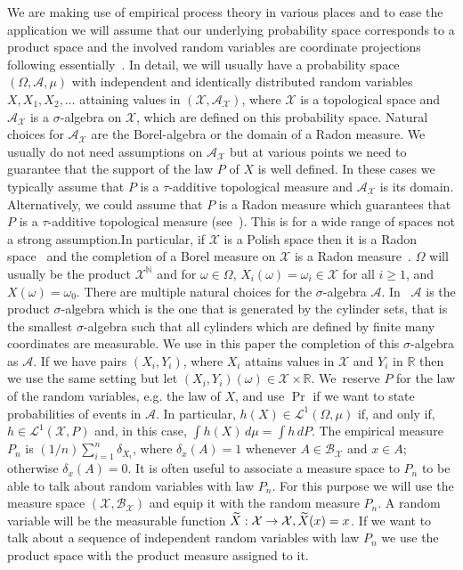 \documentclass[10pt]{amsart}
\theoremstyle{definition}\newtheorem{defi}[theo]{Definition}\newtheorem{rema}[theo]{Remark}\newtheorem{exam}[theo]{Example}\newtheorem{exem}[theo]{Example}\newtheorem{nota}[theo]{Notation}
\theoremstyle{remark}
\newcommand{\R}{\mathbb{R}}
\newcommand{\bbN}{\mathbb{N}}
\newcommand{\X}{\mathcal{X}}
\newcommand{\clB}{\mathcal{B}}
\newcommand{\clA}{\mathcal{A}}
\newcommand{\clL}{\mathcal{L}}
\newcommand*{\MK}{\mkern 2mu}
\let\oldtilde\tilde
\renewcommand*{\tilde}[1]{\mathchoice{\widetilde{#1}}{\widetilde{#1}}{\oldtilde{#1}}{\oldtilde{#1}}}
\renewcommand*{\to}{\mathchoice{\longrightarrow}{\rightarrow}{\rightarrow}{\rightarrow}}
\begin{document}
We are making use of empirical process theory in various places and to ease the application we will assume that our underlying probability space corresponds to a product space and the involved random variables are coordinate projections following essentially~\cite[Section~3.1]{DUDLEY14}. In detail, we will usually have a probability space $(\Omega,\clA,\mu)$ with independent and identically distributed random variables $X,X_1,X_2,\dots $ attaining values in $(\X,\clA_\X)$, where $\X$ is a topological space and $\clA_\X$ is a $\sigma$-algebra on $\X$, which are defined on this probability space. Natural choices for $\clA_\X$ are the Borel-algebra or the domain of a Radon measure. We usually do not need assumptions on $\clA_\X$ but at various points we need to guarantee that the support of the law $P$ of $X$ is well defined. In these cases we typically assume that $P$ is a $\tau$-additive topological measure and $\clA_\X$ is its domain. Alternatively, we could assume that $P$ is a Radon measure which guarantees that $P$ is a $\tau$-additive topological measure (see~\cite[411]{FREM}). This is for a wide range of spaces not a strong assumption.\linebreak In particular, if $\X$ is a Polish space then it is a Radon space~\cite[434K$\MK$(b)]{FREM} and the completion of a Borel measure on $\X$ is a Radon measure~\cite[434F$\MK$(a.iii), 211L]{FREM}. $\Omega$ will usually be the product $\X^\bbN$ and for $\omega \in \Omega$, $X_i(\omega) = \omega_i \in \X$ for all $i \geq 1$, and $X(\omega) = \omega_0$. There are multiple natural choices for the $\sigma$-algebra $\clA$. In~\cite[Section~3.1]{DUDLEY14} $\clA$ is the product $\sigma$-algebra which is the one that is generated by the cylinder sets, that is the smallest $\sigma$-algebra such that all cylinders which are defined by finite many coordinates are measurable. We use in this paper the completion of this $\sigma$-algebra as $\clA$. If we have pairs $(X_i,Y_i)$, where $X_i$ attains values in $\X$ and $Y_i$ in $\R$ then we use the same setting but let $(X_i,Y_i)(\omega) \in \X \times \R$. We~reserve $P$ for the law of the random variables, e.g. the law of $X$, and use $\Pr$ if we want to state probabilities of events in $\clA$. In particular, $h(X) \in \clL^1(\Omega,\mu)$ if, and only if, $h \in \clL^1(\X, P)$ and, in this case, $\int h(X) \, d\mu = \int h \,d P$. The empirical measure $P_n$ is $(1/n) \sum_{i=1}^n \delta_{X_i}$, where $\delta_x(A) = 1$ whenever $A \in \clB_\X$ and $x \in A$; otherwise $\delta_x(A) = 0$. It is often useful to associate a measure space to $P_n$ to be able to talk about random variables with law $P_n$. For this purpose we will use the measure space $(\X,\clB_\X)$ and equip it with the random measure $P_n$. A random variable will be the measurable function $\tilde X:\X \to \X, \tilde X(x) = x$. If we want to talk about a sequence of independent random variables with law $P_n$ we use the product space with the product measure assigned to it.
\end{document}

